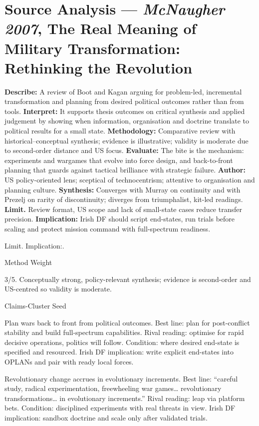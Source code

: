 \section*{Source Analysis — \textit{McNaugher 2007}, The Real Meaning of Military Transformation: Rethinking the Revolution}
\textbf{Describe:} A review of Boot and Kagan arguing for problem-led, incremental transformation and planning from desired political outcomes rather than from tools.
\textbf{Interpret:} It supports thesis outcomes on critical synthesis and applied judgement by showing when information, organisation and doctrine translate to political results for a small state.
\textbf{Methodology:} Comparative review with historical–conceptual synthesis; evidence is illustrative; validity is moderate due to second-order distance and US focus.
\textbf{Evaluate:} The bite is the mechanism: experiments and wargames that evolve into force design, and back-to-front planning that guards against tactical brilliance with strategic failure.
\textbf{Author:} US policy-oriented lens; sceptical of technocentrism; attentive to organisation and planning culture.
\textbf{Synthesis:} Converges with Murray on continuity and with Prezelj on rarity of discontinuity; diverges from triumphalist, kit-led readings.
\textbf{Limit.} Review format, US scope and lack of small-state cases reduce transfer precision.
\textbf{Implication:} Irish DF should script end-states, run trials before scaling and protect mission command with full-spectrum readiness.

Limit. Implication:.

Method Weight

3/5. Conceptually strong, policy-relevant synthesis; evidence is second-order and US-centred so validity is moderate.

Claims-Cluster Seed

Plan wars back to front from political outcomes.
Best line: plan for post-conflict stability and build full-spectrum capabilities.
Rival reading: optimise for rapid decisive operations, politics will follow.
Condition: where desired end-state is specified and resourced.
Irish DF implication: write explicit end-states into OPLANs and pair with ready local forces.

Revolutionary change accrues in evolutionary increments.
Best line: “careful study, radical experimentation, freewheeling war games… revolutionary transformations… in evolutionary increments.”
Rival reading: leap via platform bets.
Condition: disciplined experiments with real threats in view.
Irish DF implication: sandbox doctrine and scale only after validated trials.

